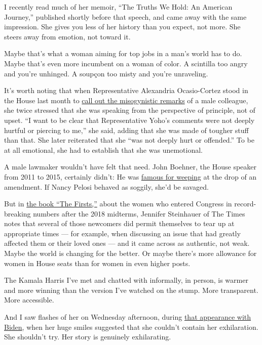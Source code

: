 I recently read much of her memoir, ``The Truths We Hold: An American
Journey,'' published shortly before that speech, and came away with the
same impression. She gives you less of her history than you expect, not
more. She steers away from emotion, not toward it.

Maybe that's what a woman aiming for top jobs in a man's world has to
do. Maybe that's even more incumbent on a woman of color. A scintilla
too angry and you're unhinged. A soupçon too misty and you're
unraveling.

It's worth noting that when Representative Alexandria Ocasio-Cortez
stood in the House last month to
\href{https://www.nytimes3xbfgragh.onion/2020/07/23/us/alexandria-ocasio-cortez-sexism-congress.html}{call
out the misogynistic remarks} of a male colleague, she twice stressed
that she was speaking from the perspective of principle, not of upset.
``I want to be clear that Representative Yoho's comments were not deeply
hurtful or piercing to me,'' she said, adding that she was made of
tougher stuff than that. She later reiterated that she ``was not deeply
hurt or offended.'' To be at all emotional, she had to establish that
she was unemotional.

A male lawmaker wouldn't have felt that need. John Boehner, the House
speaker from 2011 to 2015, certainly didn't: He was
\href{https://www.usatoday.com/story/news/nation-now/2015/09/25/john-boehner-crying-emotional-speaker-house/72799814/}{famous
for weeping} at the drop of an amendment. If Nancy Pelosi behaved as
soggily, she'd be savaged.

But in \href{https://www.workman.com/products/the-firsts}{the book ``The
Firsts,''} about the women who entered Congress in record-breaking
numbers after the 2018 midterms, Jennifer Steinhauer of The Times notes
that several of those newcomers did permit themselves to tear up at
appropriate times --- for example, when discussing an issue that had
greatly affected them or their loved ones --- and it came across as
authentic, not weak. Maybe the world is changing for the better. Or
maybe there's more allowance for women in House seats than for women in
even higher posts.

The Kamala Harris I've met and chatted with informally, in person, is
warmer and more winning than the version I've watched on the stump. More
transparent. More accessible.

And I saw flashes of her on Wednesday afternoon, during
\href{https://www.youtube.com/watch?v=ymyY7jez0rM}{that appearance with
Biden}, when her huge smiles suggested that she couldn't contain her
exhilaration. She shouldn't try. Her story is genuinely exhilarating.

